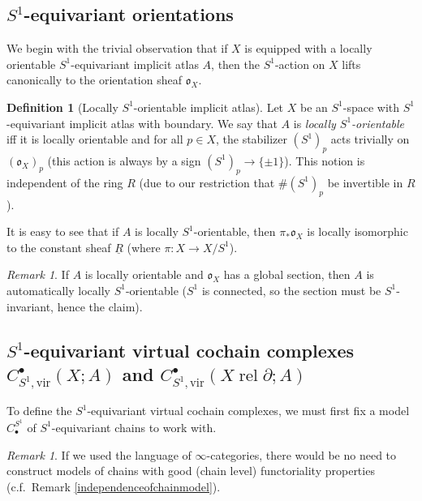 \documentclass[12pt]{article}
\theoremstyle{definition}
\newtheorem{definition}[theorem]{Definition}
\theoremstyle{remark}
\newtheorem{remark}[theorem]{Remark}
\numberwithin{equation}{subsection}
\newcommand{\oo}{\mathfrak o}
\newcommand{\vir}{\mathrm{vir}}
\newcommand{\rel}{\operatorname{rel}}
\begin{document}
\subsection{\texorpdfstring{$S^1$}{S{\textasciicircum}1}-equivariant orientations}

We begin with the trivial observation that if $X$ is equipped with a locally orientable $S^1$-equivariant implicit atlas $A$, then the $S^1$-action on $X$ lifts canonically to the orientation sheaf $\oo_X$.

\begin{definition}[Locally $S^1$-orientable implicit atlas]\label{virtualorSS}
Let $X$ be an $S^1$-space with $S^1$-equivariant implicit atlas with boundary.  We say that $A$ is \emph{locally $S^1$-orientable} iff it is locally orientable and for all $p\in X$, the stabilizer $(S^1)_p$ acts trivially on $(\oo_X)_p$ (this action is always by a sign $(S^1)_p\to\{\pm 1\}$).  This notion is independent of the ring $R$ (due to our restriction that $\#(S^1)_p$ be invertible in $R$).
\end{definition}

It is easy to see that if $A$ is locally $S^1$-orientable, then $\pi_\ast\oo_X$ is locally isomorphic to the constant sheaf $\underline R$ (where $\pi:X\to X/S^1$).

\begin{remark}\label{orientedthenSSoriented}
If $A$ is locally orientable and $\oo_X$ has a global section, then $A$ is automatically locally $S^1$-orientable ($S^1$ is connected, so the section must be $S^1$-invariant, hence the claim).
\end{remark}

\subsection{\texorpdfstring{$S^1$}{S{\textasciicircum}1}-equivariant virtual cochain complexes \texorpdfstring{$C^\bullet_{S^1,\vir}(X;A)$}{C\_S{\textasciicircum}1,vir(X;A)} and \texorpdfstring{$C^\bullet_{S^1,\vir}(X\rel\partial;A)$}{C\_S{\textasciicircum}1,vir(X rel d;A)}}\label{SSCconstruct}

To define the $S^1$-equivariant virtual cochain complexes, we must first fix a model $C_\bullet^{S^1}$ of $S^1$-equivariant chains to work with.

\begin{remark}
If we used the language of $\infty$-categories, there would be no need to construct models of chains with good (chain level) functoriality properties (c.f.\ Remark \ref{independenceofchainmodel}).
\end{remark}
\end{document}
